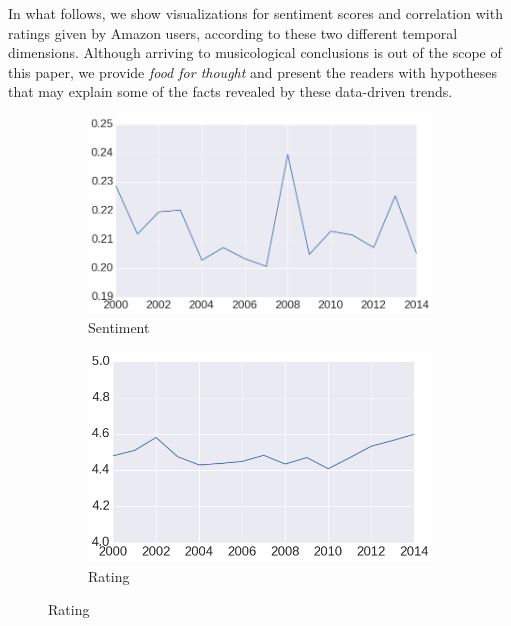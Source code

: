 In what follows, we show visualizations for sentiment scores and correlation with ratings given by Amazon users, according to these two different temporal dimensions. Although arriving to musicological conclusions is out of the scope of this paper, we provide \textit{food for thought} and present the readers with hypotheses that may explain some of the facts revealed by these data-driven trends.

\begin{figure}[ht!]
    \centering
    \begin{subfigure}{.3\textwidth}
        \centering
        \includegraphics[width=.9\linewidth]{ch08_musicology/pics/all_average.png}
        \caption{Sentiment}
        \label{fig:avgSentReview}
    \end{subfigure}
    \begin{subfigure}{.3\textwidth}
        \centering
        \includegraphics[width=.9\linewidth]{ch08_musicology/pics/avg_score.png}
        \caption{Rating}
        \label{fig:avgRatingReview}
    \end{subfigure}

\end{figure}
